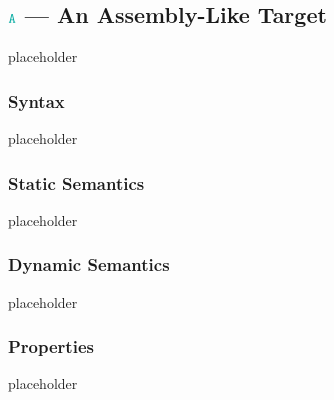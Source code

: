 \subsection{$\obj{A}$ --- An Assembly-Like Target}\label{subsec-a}
placeholder
\subsubsection{Syntax}\label{subsec-a-syntax}
placeholder
\subsubsection{Static Semantics}\label{subsec-a-static}
placeholder
\subsubsection{Dynamic Semantics}\label{subsec-a-dynamic}
placeholder
\subsubsection{Properties}\label{subsec-a-properties}
placeholder

